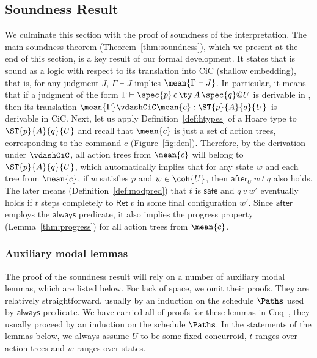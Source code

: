 \subsection{Soundness Result}
\label{sec:soundness}

We culminate this section with the proof of soundness of the
interpretation. 
%
The main soundness theorem (Theorem~\ref{thm:soundness}), which we
present at the end of this section, is a key result of our formal
development. It states that \SCST is sound as a logic with respect to
its translation into CiC (\ie shallow embedding), that is, for any
judgment $J$, $\Gamma \vdash J$ implies $\mean{\Gamma \vdash J}$. 
%
In particular, it means that if a judgment of the form $\Gamma \vdash
\spec{p}\,c\, \ty \,A\,\spec{q}@U$ is derivable in \SCST, then its
translation $\mean{\Gamma} \vdashCiC \mean{c} : \ST{p}{A}{q}{U}$ is
derivable in CiC. 
%
Next, let us apply Definition~\ref{def:htypes} of a Hoare type to
$\ST{p}{A}{q}{U}$ and recall that $\mean{c}$ is just a set of action
trees, corresponding to the command $c$ (Figure~\ref{fig:den}).
%
Therefore, by the derivation under $\vdashCiC$, all action trees from
$\mean{c}$ will belong to $\ST{p}{A}{q}{U}$, which automatically
implies that for any state $w$ and each tree from $\mean{c}$, if $w$
satisfies $p$ and $w \in \coh{U}$, then $\mathsf{after}_U~w~t~q$ also
holds. The later means (Definition~\ref{def:modpred}) that $t$ is
$\mathsf{safe}$ and $q~v~w'$ eventually holds if $t$ steps completely
to $\mathsf{Ret}~v$ in some final configuration $w'$. Since $\mathsf{after}$
employs the $\mathsf{always}$ predicate, it also implies the progress
property (Lemma~\ref{thm:progress}) for all action trees from $\mean{c}$.

\subsubsection{Auxiliary modal lemmas}
\label{sec:auxil-modal-lemm}

The proof of the soundness result will rely on a number of auxiliary
modal lemmas, which are listed below.
%
For lack of space, we omit their proofs. They are relatively
straightforward, usually by an induction on the schedule $\Paths$
used by $\mathsf{always}$ predicate.
%
We have carried all of proofs for these lemmas in
Coq~\cite{fcsl-coqscripts}, they usually proceed by an induction on
the schedule $\Paths$.
%
In the statements of the lemmas below, we always assume $U$ to be some
fixed concurroid, $t$ ranges over action trees and $w$ ranges over
states.

